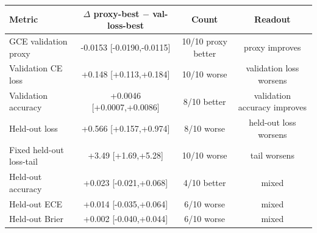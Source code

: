 \begin{tabular}{lccc}
\toprule
Metric & $\Delta$ proxy-best $-$ val-loss-best & Count & Readout \\
\midrule
GCE validation proxy & -0.0153 [-0.0190,-0.0115] & 10/10 proxy better & proxy improves \\
Validation CE loss & +0.148 [+0.113,+0.184] & 10/10 worse & validation loss worsens \\
Validation accuracy & +0.0046 [+0.0007,+0.0086] & 8/10 better & validation accuracy improves \\
Held-out loss & +0.566 [+0.157,+0.974] & 8/10 worse & held-out loss worsens \\
Fixed held-out loss-tail & +3.49 [+1.69,+5.28] & 10/10 worse & tail worsens \\
Held-out accuracy & +0.023 [-0.021,+0.068] & 4/10 better & mixed \\
Held-out ECE & +0.014 [-0.035,+0.064] & 6/10 worse & mixed \\
Held-out Brier & +0.002 [-0.040,+0.044] & 6/10 worse & mixed \\
\bottomrule
\end{tabular}
